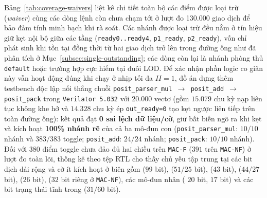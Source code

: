 Bảng~\ref{tab:coverage-waivers} liệt kê chi tiết toàn bộ các điểm được loại trừ
(\textit{waiver}) cùng các dòng lệnh còn chưa chạm tới ở lượt đo 130.000 giao dịch
để bảo đảm tính minh bạch khi rà soát. Các nhánh được loại trừ đều nằm ở tín hiệu
giữ kẹt nội bộ giữa các tầng (\texttt{ready0..ready4}, \texttt{p1\_ready}, \texttt{p2\_ready}),
vốn chỉ phát sinh khi tồn tại đồng thời từ hai giao dịch trở lên trong đường ống
như đã phân tích ở Mục~\ref{subsec:single-outstanding}; các dòng còn lại là nhánh phòng thủ \texttt{default}
hoặc trường hợp cực hiếm tại đuôi LOD. Để xác nhận phần logic co giãn này vẫn
hoạt động đúng khi chạy ở nhịp tối đa $II=1$, đồ án dựng thêm testbench độc lập
nối thẳng chuỗi \texttt{posit\_parser\_mul $\to$ posit\_add $\to$ posit\_pack}
trong \texttt{Verilator 5.032} với $20.000$ vectơ (gồm $15.079$ chu kỳ nạp liên
tục không khe hở và $14.328$ chu kỳ ép \texttt{out\_ready=0} tạo kẹt ngược liên
tiếp trên toàn đường ống): kết quả đạt \textbf{0 sai lệch dữ liệu/cờ}, giữ bất
biến ngõ ra khi kẹt và kích hoạt \textbf{100\% nhánh rẽ} của cả ba mô-đun con
(\texttt{posit\_parser\_mul}: $10/10$ nhánh và $383/383$ toggle; \texttt{posit\_add}:
$24/24$ nhánh; \texttt{posit\_pack}: $10/10$ nhánh). Đối với $380$ điểm toggle
chưa đảo đủ hai chiều trên \texttt{MAC-F} ($391$ trên \texttt{MAC-NF}) ở lượt đo
toàn lõi, thống kê theo tệp RTL cho thấy chủ yếu tập trung tại các bit dịch dải
rộng và cờ ít kích hoạt ở biên gồm  ($99$ bit),
 ($51/25$ bit),  ($43$ bit),
 ($44/27$ bit),  ($26$ bit),
 ($32$ bit riêng ở \texttt{MAC-NF}), các mô-đun nhân
( $20$ bit,  $17$ bit) và các
bit trạng thái tĩnh trong  ($31/60$ bit).

